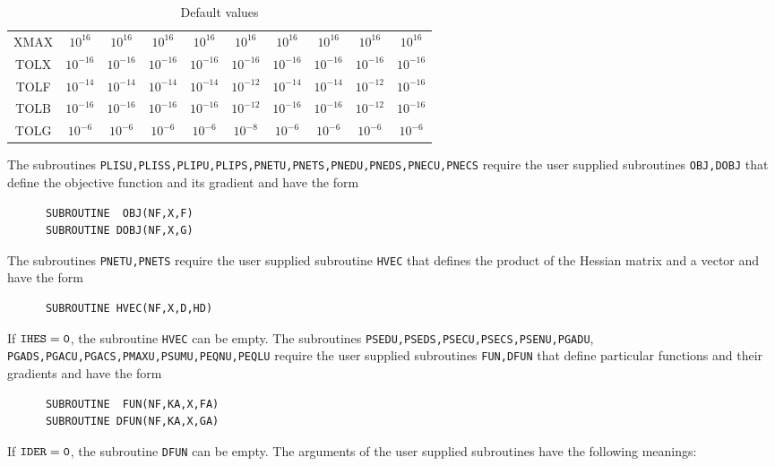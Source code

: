 \documentclass{esub2acm}
\begin{document}
\begin{table}[h]
{\begin{tabular}{c|*{9}c}
XMAX & $10^{16}$  & $10^{16}$  & $10^{16}$  & $10^{16}$  & $10^{16}$  & $10^{16}$  & $10^{16}$  & $10^{16}$  & $10^{16}$  \\
TOLX & $10^{-16}$ & $10^{-16}$ & $10^{-16}$ & $10^{-16}$ & $10^{-16}$ & $10^{-16}$ & $10^{-16}$ & $10^{-16}$ & $10^{-16}$ \\
TOLF & $10^{-14}$ & $10^{-14}$ & $10^{-14}$ & $10^{-14}$ & $10^{-12}$ & $10^{-14}$ & $10^{-14}$ & $10^{-12}$ & $10^{-16}$ \\
TOLB & $10^{-16}$ & $10^{-16}$ & $10^{-16}$ & $10^{-16}$ & $10^{-12}$ & $10^{-16}$ & $10^{-16}$ & $10^{-12}$ & $10^{-16}$ \\
TOLG & $10^{-6}$  & $10^{-6}$  & $10^{-6}$  & $10^{-6}$  & $10^{-8}$  & $10^{-6}$  & $10^{-6}$  & $10^{-6}$  & $10^{-6}$  \\ \hline
\end{tabular}
}
\caption{Default values}
\label{defaults}
\end{table}

\vspace{3mm}

\rm

\noindent The subroutines {\tt PLISU,PLISS,PLIPU,PLIPS,PNETU,PNETS,PNEDU,PNEDS,PNECU,PNECS}
require the user supplied subroutines {\tt OBJ,DOBJ} that define
the objective function and its gradient and have the form

\begin{verbatim}
      SUBROUTINE  OBJ(NF,X,F)
      SUBROUTINE DOBJ(NF,X,G)
\end{verbatim}

\noindent The subroutines {\tt PNETU,PNETS} require the user supplied subroutine
{\tt HVEC} that defines the product of the Hessian matrix and a vector and have the form

\begin{verbatim}
      SUBROUTINE HVEC(NF,X,D,HD)
\end{verbatim}

\noindent If ${\tt IHES=0}$, the subroutine {\tt HVEC} can be empty. The subroutines
{\tt PSEDU,PSEDS,PSECU,PSECS,PSENU,PGADU}, {\tt PGADS,PGACU,PGACS,PMAXU,PSUMU,PEQNU,PEQLU}
require the user supplied subroutines {\tt FUN,DFUN} that define particular functions and
their gradients and have the form

\begin{verbatim}
      SUBROUTINE  FUN(NF,KA,X,FA)
      SUBROUTINE DFUN(NF,KA,X,GA)
\end{verbatim}

\noindent If ${\tt IDER=0}$, the subroutine {\tt DFUN} can be empty. The arguments of
the user supplied subroutines have the following meanings:
\end{document}
